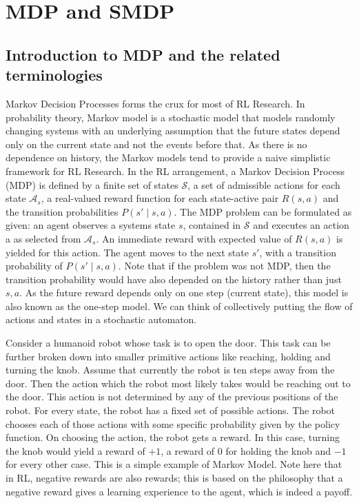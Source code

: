 \appendix
\section{MDP and SMDP}
\subsection{Introduction to MDP and the related terminologies}



Markov Decision Processes forms the crux for most of RL Research. In probability theory, Markov model is a stochastic model that models randomly changing systems with an underlying assumption that the future states depend only on the current state and not the events before that. As there is no dependence on history, the Markov models tend to provide a naive simplistic framework for RL Research. In the RL arrangement, a Markov Decision Process (MDP) is defined by a finite set of states \(\mathcal{S}\), a set of admissible actions for each state \(\mathcal{A}_s\), a real-valued reward function for each state-active pair \(R(s,a)\) and the transition probabilities \(P(s' \mid s,a)\). The MDP problem can be formulated as given: an agent observes a systems state \(s\), contained in \(\mathcal{S}\) and executes an action a as selected from \(\mathcal{A}_s\). An immediate reward with expected value of \(R(s,a)\) is yielded for this action. The agent moves to the next state  \(s'\), with a transition probability of \(P(s' \mid s,a)\). Note that if the problem was not MDP, then the transition probability would have also depended on the history rather than just \(s,a\). As the future reward depends only on one step (current state), this model is also known as the one-step model. We can think of collectively putting the flow of actions and states in a stochastic automaton. 


Consider a humanoid robot whose task is to open the door. This task can be further broken down into smaller primitive actions like reaching, holding and turning the knob. Assume that currently the robot is ten steps away from the door. Then the action which the robot most likely takes would be reaching out to the door. This action is not determined by any of the previous positions of the robot. For every state, the robot has a fixed set of possible actions. The robot chooses each of those actions with some specific probability given by the policy function. On choosing the action, the robot gets a reward. In this case, turning the knob would yield a reward of \(+1\), a reward of \(0\) for holding the knob and \(-1\) for every other case. This is a simple example of Markov Model. Note here that in RL, negative rewards are also rewards; this is based on the philosophy that a negative reward gives a learning experience to the agent, which is indeed a payoff. 


